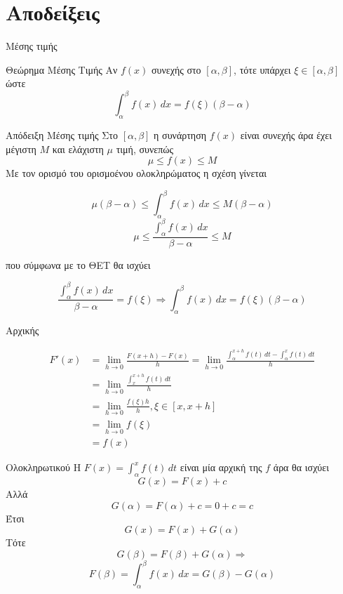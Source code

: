 \documentclass{presentation}
\begin{document}
\appendix
\section{Αποδείξεις}
\begin{frame}{Μέσης τιμής}
  \begin{block}{Θεώρημα Μέσης Τιμής}
    Αν $f(x)$ συνεχής στο $[α,β]$, τότε υπάρχει $ξ\in [α,β]$ ώστε
    $$\int_α^βf(x)\, dx=f(ξ)(β-α)$$
  \end{block}
\end{frame}

\begin{frame}{Απόδειξη Μέσης τιμής}
  Στο $[α,β]$ η συνάρτηση $f(x)$ είναι συνεχής άρα έχει μέγιστη $Μ$ και ελάχιστη $μ$ τιμή, συνεπώς
  $$μ\le f(x) \le Μ$$
  Με τον ορισμό του ορισμοένου ολοκληρώματος η σχέση γίνεται

  $$μ(β-α)\le \int_α^βf(x)\, dx \le Μ(β-α)$$
  $$μ\le \frac{\int_α^βf(x)\, dx}{β-α} \le Μ$$

  που σύμφωνα με το ΘΕΤ θα ισχύει

  $$\frac{\int_α^βf(x)\, dx}{β-α}=f(ξ)\Rightarrow \int_α^βf(x)\, dx=f(ξ)(β-α)$$

\end{frame}

\begin{frame}{Αρχικής}

  \begin{align*}
    F'(x) & =\lim_{h\to 0}\frac{F(x+h)-F(x)}{h}=\lim_{h\to 0}\frac{\int_α^{x+h} f(t) \, dt-\int_α^x f(t) \, dt}{h} \\
          & =\lim_{h\to 0}\frac{\int_x^{x+h} f(t) \, dt}{h}                                                        \\
          & = \lim_{h\to 0}\frac{f(ξ)h}{h},ξ\in[x,x+h]                                                             \\
          & = \lim_{h\to 0}f(ξ)                                                                                    \\
          & =f(x)
  \end{align*}

\end{frame}

\begin{frame}{Ολοκληρωτικού}
  Η $F(x)=\int_α^x f(t) \, dt$ είναι μία αρχική της $f$ άρα θα ισχύει
  $$G(x)=F(x)+c$$
  Αλλά $$G(α)=F(α)+c=0+c=c$$
  Έτσι $$G(x)=F(x)+G(α)$$
  Τότε $$G(β)=F(β)+G(α)\Rightarrow$$
  $$ F(β)=\int_α^β f(x) \, dx=G(β)-G(α)$$
\end{frame}

\moodle
\end{document}
